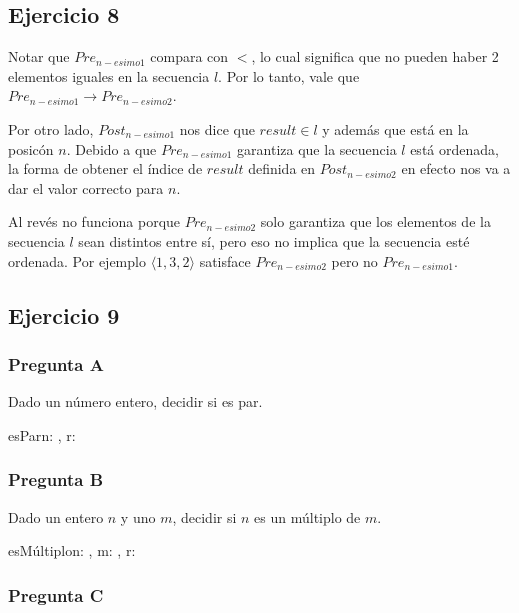 \subsection{Ejercicio 8}

Notar que $Pre_{n-esimo1}$ compara con $<$, lo cual significa que no pueden haber 2 elementos iguales en la secuencia $l$. Por lo tanto, vale que $Pre_{n-esimo1} \rightarrow Pre_{n-esimo2}$.

Por otro lado, $Post_{n-esimo1}$ nos dice que $result \in l $ y además que está en la posicón $n$. Debido a que $Pre_{n-esimo1}$ garantiza que la secuencia $l$ está ordenada, la forma de obtener el índice de $result$ definida en $Post_{n-esimo2}$ en efecto nos va a dar el valor correcto para $n$.

Al revés no funciona porque $Pre_{n-esimo2}$ solo garantiza que los elementos de la secuencia $l$ sean distintos entre sí, pero eso no implica que la secuencia esté ordenada. Por ejemplo $\langle 1,3,2 \rangle$ satisface $Pre_{n-esimo2}$ pero no $Pre_{n-esimo1}$.

\subsection{Ejercicio 9}

\subsubsection{Pregunta A}

Dado un número entero, decidir si es par.

\begin{proc}{esPar}{\In n: \ent, \Out r: \bool}{}
\end{proc}

\subsubsection{Pregunta B}

Dado un entero $n$ y uno $m$, decidir si $n$ es un múltiplo de $m$.

\begin{proc}{esMúltiplo}{\In n: \ent, \In m: \ent, \Out r: \bool}{}
\end{proc}

\subsubsection{Pregunta C}


